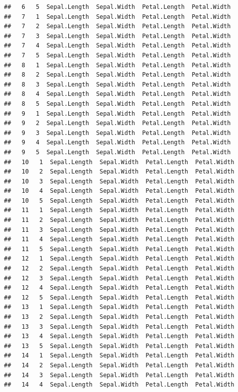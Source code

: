 \documentclass[
]{book}
\begin{document}
\begin{verbatim}
##   6   5  Sepal.Length  Sepal.Width  Petal.Length  Petal.Width
##   7   1  Sepal.Length  Sepal.Width  Petal.Length  Petal.Width
##   7   2  Sepal.Length  Sepal.Width  Petal.Length  Petal.Width
##   7   3  Sepal.Length  Sepal.Width  Petal.Length  Petal.Width
##   7   4  Sepal.Length  Sepal.Width  Petal.Length  Petal.Width
##   7   5  Sepal.Length  Sepal.Width  Petal.Length  Petal.Width
##   8   1  Sepal.Length  Sepal.Width  Petal.Length  Petal.Width
##   8   2  Sepal.Length  Sepal.Width  Petal.Length  Petal.Width
##   8   3  Sepal.Length  Sepal.Width  Petal.Length  Petal.Width
##   8   4  Sepal.Length  Sepal.Width  Petal.Length  Petal.Width
##   8   5  Sepal.Length  Sepal.Width  Petal.Length  Petal.Width
##   9   1  Sepal.Length  Sepal.Width  Petal.Length  Petal.Width
##   9   2  Sepal.Length  Sepal.Width  Petal.Length  Petal.Width
##   9   3  Sepal.Length  Sepal.Width  Petal.Length  Petal.Width
##   9   4  Sepal.Length  Sepal.Width  Petal.Length  Petal.Width
##   9   5  Sepal.Length  Sepal.Width  Petal.Length  Petal.Width
##   10   1  Sepal.Length  Sepal.Width  Petal.Length  Petal.Width
##   10   2  Sepal.Length  Sepal.Width  Petal.Length  Petal.Width
##   10   3  Sepal.Length  Sepal.Width  Petal.Length  Petal.Width
##   10   4  Sepal.Length  Sepal.Width  Petal.Length  Petal.Width
##   10   5  Sepal.Length  Sepal.Width  Petal.Length  Petal.Width
##   11   1  Sepal.Length  Sepal.Width  Petal.Length  Petal.Width
##   11   2  Sepal.Length  Sepal.Width  Petal.Length  Petal.Width
##   11   3  Sepal.Length  Sepal.Width  Petal.Length  Petal.Width
##   11   4  Sepal.Length  Sepal.Width  Petal.Length  Petal.Width
##   11   5  Sepal.Length  Sepal.Width  Petal.Length  Petal.Width
##   12   1  Sepal.Length  Sepal.Width  Petal.Length  Petal.Width
##   12   2  Sepal.Length  Sepal.Width  Petal.Length  Petal.Width
##   12   3  Sepal.Length  Sepal.Width  Petal.Length  Petal.Width
##   12   4  Sepal.Length  Sepal.Width  Petal.Length  Petal.Width
##   12   5  Sepal.Length  Sepal.Width  Petal.Length  Petal.Width
##   13   1  Sepal.Length  Sepal.Width  Petal.Length  Petal.Width
##   13   2  Sepal.Length  Sepal.Width  Petal.Length  Petal.Width
##   13   3  Sepal.Length  Sepal.Width  Petal.Length  Petal.Width
##   13   4  Sepal.Length  Sepal.Width  Petal.Length  Petal.Width
##   13   5  Sepal.Length  Sepal.Width  Petal.Length  Petal.Width
##   14   1  Sepal.Length  Sepal.Width  Petal.Length  Petal.Width
##   14   2  Sepal.Length  Sepal.Width  Petal.Length  Petal.Width
##   14   3  Sepal.Length  Sepal.Width  Petal.Length  Petal.Width
##   14   4  Sepal.Length  Sepal.Width  Petal.Length  Petal.Width

\end{verbatim}
\end{document}
